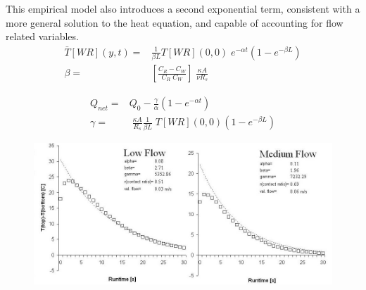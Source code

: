 This empirical model also introduces a second exponential term, consistent with a more general solution to the heat equation, and capable of accounting for flow related variables.
\begin{equation}\label{completetemp}
\begin{aligned}
\bar{T}[WR](y,t)=&\frac{1}{\beta L}T[WR](0,0)\;e^{-\alpha t}(1-e^{-\beta L})\\
\beta=&\left[\frac{C_{R}-C_{W}}{C_{R}\;C_{W}}\right]\;\frac{\kappa A}{\nu R_{s}}
\end{aligned}
\end{equation}


\begin{equation}\label{completeheat}
\begin{aligned}
Q_{net}=&Q_{0}-\frac{\gamma}{\alpha}(1-e^{-\alpha t})\\
\gamma=&\;\frac{\kappa A}{R_{s}}\frac{1}{\beta L}\;T[WR](0,0)(1-e^{-\beta L})
\end{aligned}
\end{equation}

\pagebreak

\begin{figure}[!h]
\begin{center}
\caption[Empirical Model and Data Comparison - Low]{\label{steelMed}}
\includegraphics[scale=.5]{flowDouble.jpg}
\end{center}
\end{figure}

